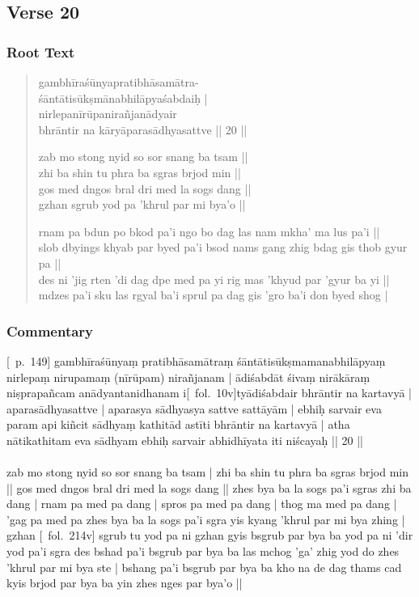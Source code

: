 \documentclass[12pt]{article}
\begin{document}
\subsection{Verse 20}
\subsubsection{Root Text}
\begin{quote}
	gambhīraśūnyapratibhāsamātra\footnoteB{
		°mātra°] \EDD ; mātraṃ \MS
	}-\\
	śāntāti\footnoteB{
		śāntāti] \EDD ; sāntādi \MS
	}sūkṣmānabhilāpyaśabdaiḥ |\\
	nirlepanīrūpa\footnoteB{
		nirlepanīrūpa°] \EDD\ (\emd) ; nirlepanīpa \MS
	}nirañjanādyair \\
	bhrāntir na kāryāparasādhyasattve || 20 ||

	zab mo stong nyid so sor snang ba tsam || \\
	zhi ba shin tu phra ba sgras brjod min || \\
	gos med dngos bral dri med la sogs dang || \\
	gzhan sgrub yod pa 'khrul par mi bya'o || 

	rnam pa bdun po bkod pa'i ngo bo dag las nam mkha' ma lus pa'i || \\
	slob dbyings khyab par byed pa'i bsod nams gang zhig bdag gis thob gyur pa || \\
	des ni 'jig rten 'di dag dpe med pa yi rig mas 'khyud par 'gyur ba yi || \\
	mdzes pa'i sku las rgyal ba'i sprul pa dag gis 'gro ba'i don byed shog |
\end{quote}

\subsubsection{Commentary}
[\EDD\ p.\ 149] gambhīraśūnyaṃ pratibhāsamātraṃ śāntātisūkṣmamanabhilāpyaṃ nirlepaṃ nirupamaṃ (nīrūpam) nirañjanam | ādiśabdāt śivaṃ nirākāraṃ niṣprapañcam anādyantanidhanam i[\MS\ fol.\ 10v]tyādiśabdair bhrāntir na kartavyā | aparasādhyasattve | aparasya sādhyasya sattve sattāyām | ebhiḥ sarvair eva param api kiñcit sādhyaṃ kathitād astīti bhrāntir na kartavyā | atha nātikathitam eva sādhyam ebhiḥ sarvair abhidhīyata iti niścayaḥ || 20 ||\\

\textbf{\TVA}\\
zab mo stong nyid so sor snang ba tsam | zhi ba shin tu phra ba sgras brjod min || gos med dngos bral dri med la sogs dang || zhes bya ba la sogs pa'i sgras zhi ba dang | rnam pa med pa dang | spros pa med pa dang | thog ma med pa dang | 'gag pa med pa zhes bya ba la sogs pa'i sgra yis kyang 'khrul par mi bya zhing | gzhan [\TVA\ fol.\ 214v] sgrub tu yod pa ni gzhan gyis bsgrub par bya ba yod pa ni 'dir yod pa'i sgra des bshad pa'i bsgrub par bya ba las mchog 'ga' zhig yod do zhes 'khrul par mi bya ste | bshang pa'i bsgrub par bya ba kho na de dag thams cad kyis brjod par bya ba yin zhes nges par bya'o || \\
\end{document}
